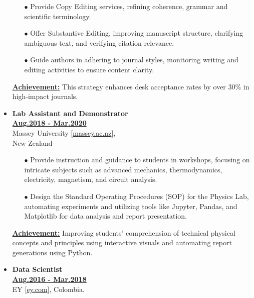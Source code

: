 \begin{itemize}[leftmargin=5mm]
          \begin{itemize}[leftmargin=0mm]
              \small

              \item[$\bullet$] Provide Copy Editing services, refining coherence, grammar and scientific terminology.
              \item[$\bullet$] Offer Substantive Editing, improving manuscript structure, clarifying ambiguous text, and verifying citation relevance.
              \item[$\bullet$] Guide authors in adhering to journal styles, monitoring writing and editing activities to ensure content clarity.
          \end{itemize}

          \textbf{\href{.}{\underline{Achievement:}}}
          This strategy enhances desk acceptance rates by over 30\% in high-impact journals.


    \item \textbf{\large Lab Assistant and Demonstrator}\\
          \href{.}{\bf Aug.2018 - Mar.2020}\\
          Massey University [\href{www.massey.ac.nz}{massey.ac.nz}],\\
          New Zealand

          \begin{itemize}[leftmargin=0mm]
              \small

              \item[$\bullet$] Provide instruction and guidance to students in workshops, focusing on intricate subjects such as advanced mechanics, thermodynamics, electricity, magnetism, and circuit analysis.
              \item[$\bullet$] Design the Standard Operating Procedures (SOP) for the Physics Lab, automating experiments and utilizing tools like Jupyter, Pandas, and Matplotlib for data analysis and report presentation.
          \end{itemize}

          \textbf{\href{.}{\underline{Achievement:}}}
          Improving students' comprehension of technical physical concepts and principles using interactive visuals and automating report generations using Python.

    \item \textbf{\large Data Scientist}\\
          \href{.}{\bf Aug.2016 - Mar.2018}\\
          EY [\href{www.ey.com}{ey.com}],
          Colombia.


\end{itemize}
